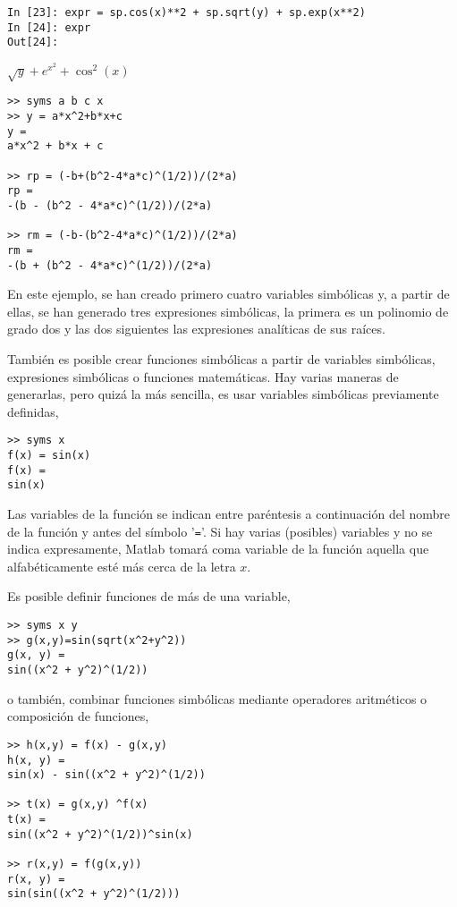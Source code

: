\begin{center}
\begin{minipage}{.5\textwidth}
	\begin{verbatim}
In [23]: expr = sp.cos(x)**2 + sp.sqrt(y) + sp.exp(x**2)
In [24]: expr
Out[24]: 			
	\end{verbatim}
	$\sqrt{y}+e^{x^2}+\cos^2(x)$
\end{minipage}
\end{center}

\begin{verbatim}
>> syms a b c x
>> y = a*x^2+b*x+c 
y = 
a*x^2 + b*x + c
 
>> rp = (-b+(b^2-4*a*c)^(1/2))/(2*a) 
rp = 
-(b - (b^2 - 4*a*c)^(1/2))/(2*a)
 
>> rm = (-b-(b^2-4*a*c)^(1/2))/(2*a) 
rm = 
-(b + (b^2 - 4*a*c)^(1/2))/(2*a)
\end{verbatim}

En este ejemplo, se han creado primero cuatro variables simbólicas y, a partir de ellas, se han generado tres expresiones simbólicas, la primera es un polinomio de grado dos y las dos siguientes las expresiones analíticas de sus raíces.

También es posible crear funciones simbólicas a partir de variables simbólicas, expresiones simbólicas o funciones matemáticas. Hay varias maneras de generarlas, pero quizá la más sencilla, es usar variables simbólicas previamente definidas,

\begin{verbatim}
>> syms x
f(x) = sin(x)
f(x) = 
sin(x)
\end{verbatim}

Las variables de la función se indican entre paréntesis a continuación del nombre de la función y antes del símbolo '\texttt{=}'. Si hay varias (posibles) variables y no se indica expresamente, Matlab tomará coma variable de la función aquella que alfabéticamente esté más cerca de la letra $x$. 

Es posible definir funciones de más de una variable,

\begin{verbatim}
>> syms x y
>> g(x,y)=sin(sqrt(x^2+y^2)) 
g(x, y) = 
sin((x^2 + y^2)^(1/2))
\end{verbatim}

o también, combinar funciones simbólicas mediante operadores aritméticos o composición de funciones, 
\begin{verbatim}
>> h(x,y) = f(x) - g(x,y)
h(x, y) =
sin(x) - sin((x^2 + y^2)^(1/2))
 
>> t(x) = g(x,y) ^f(x) 
t(x) = 
sin((x^2 + y^2)^(1/2))^sin(x)

>> r(x,y) = f(g(x,y)) 
r(x, y) = 
sin(sin((x^2 + y^2)^(1/2)))
\end{verbatim}

